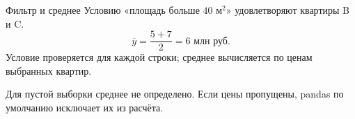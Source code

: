 \begin{frame}{Фильтр и среднее}
  Условию «площадь больше $40$ м$^2$» удовлетворяют квартиры B и C.
  \[
    \overline y=\frac{5+7}{2}=6\text{ млн руб.}
  \]
  Условие проверяется для каждой строки; среднее вычисляется по ценам выбранных квартир.
  \medskip\par
  Для пустой выборки среднее не определено. Если цены пропущены,
  pandas по умолчанию исключает их из расчёта.
\end{frame}
